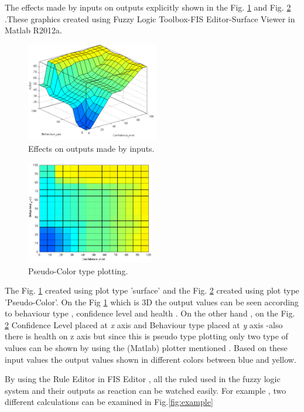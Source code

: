 The effects made by inputs on outputs explicitly shown in the Fig. \ref{fig:surface} and Fig. \ref{fig:pseudo} .These graphics created using Fuzzy Logic Toolbox-FIS Editor-Surface Viewer in Matlab R2012a. 


\begin{figure}[ht]
    \centering
    \includegraphics[width=0.52\textwidth]{Images/surface.png}
    \caption{Effects on outputs made by inputs.}
    \label{fig:surface}
\end{figure}

\begin{figure}[ht]
    \centering
    \includegraphics[width=0.5\textwidth]{Images/pseudo-color_1.png}
    \caption{Pseudo-Color type plotting.}
    \label{fig:pseudo}
\end{figure}

The Fig. \ref{fig:surface} created using plot type 'surface' and the Fig. \ref{fig:pseudo} created using plot type 'Pseudo-Color'. On the Fig \ref{fig:surface} which is 3D the output values can be seen according to behaviour type , confidence level and health . On the other hand  ,  on the Fig. \ref{fig:pseudo} Confidence Level placed at \textit{x} axis and Behaviour type placed at \textit{y} axis -also there is health on z axis but since this is pseudo type plotting only two type of values can be shown by using the (Matlab) plotter mentioned . Based on these input values the output values shown in different colors between blue and yellow.

By using the Rule Editor in FIS Editor , all the ruled used in the fuzzy logic system and their outputs as reaction can be watched easily.  For example , two different calculations can be examined in Fig.\ref{fig:example}


